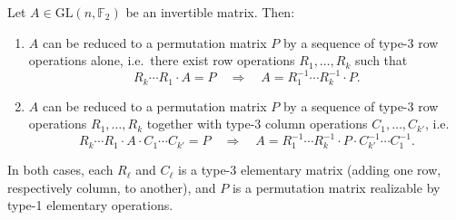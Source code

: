 \begin{theorem}
\label{thm:basic-elementary-matrix-operation-type-1-and-3}
Let $A \in \mathrm{GL}(n, \mathbb{F}_{2})$ be an invertible matrix. Then:

\begin{enumerate}
\item[(a)] $A$ can be reduced to a permutation matrix $P$ by a sequence of
type-3 row operations alone, i.e.\ there exist row operations
$R_1, \ldots, R_k$ such that
\begin{equation}
    \label{eq:basic-elementary-matrix-left-multiplication}
	R_{k} \cdots R_{1} \cdot A = P
	\quad \Longrightarrow \quad
	A = R_{1}^{-1} \cdots R_{k}^{-1} \cdot P.
\end{equation}

\item[(b)] $A$ can be reduced to a permutation matrix $P$ by a sequence of
type-3 row operations $R_1, \ldots, R_k$ together with type-3 column
operations $C_1, \ldots, C_{k'}$, i.e.
\begin{equation}
    \label{eq:basic-celementary-matrix-left-right-multiplication}
	R_{k} \cdots R_{1} \cdot A \cdot C_{1} \cdots C_{k'} = P
	\quad \Longrightarrow \quad
	A = R_{1}^{-1} \cdots R_{k}^{-1} \cdot P \cdot C_{k'}^{-1} \cdots C_{1}^{-1}.
\end{equation}
\end{enumerate}

In both cases, each $R_\ell$ and $C_\ell$ is a type-3 elementary matrix
(adding one row, respectively column, to another), and $P$ is a permutation
matrix realizable by type-1 elementary operations.
\end{theorem}

